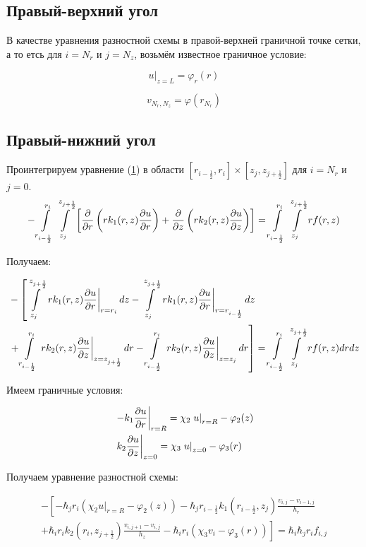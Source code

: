 \subsection{Правый-верхний угол}

В качестве уравнения разностной схемы в правой-верхней граничной точке сетки, а то етсь 
для $ i = N_r $ и $ j = N_z $, возьмём известное граничное условие:

\[
  \left . u \right \vert_{z=L} = \varphi_r(r) 
\]

\[
  v_{N_r,N_z} = \varphi(r_{N_r})
\]

\subsection{Правый-нижний угол}

Проинтегрируем уравнение (\hyperref[eq1]{1}) в области
$ [r_{i-\frac{1}{2}}, r_{i}] \times  [z_{j}, z_{j +\frac{1}{2}}] $
для $ i = N_r $ и $ j = 0 $.
\[
  - \int\limits^{r_{i }}_{r_{i -\frac{1}{2}}} \int\limits^{z_{j +\frac{1}{2}}}_{z_{j }} \left [ \pdv{}{r} \left ( r k_1(r, z) \pdv{u}{r} \right ) 
  + \pdv{}{z} \left ( rk_2(r, z)\pdv{u}{z} \right ) \right ] = \int\limits^{r_{i }}_{r_{i -\frac{1}{2}}} \int\limits^{z_{j +\frac{1}{2}}}_{z_{j }} rf(r, z)
\]

Получаем:

\begin{align*}
  &- \left [
   \int\limits^{z_{j +\frac{1}{2}}}_{z_{j }}  \left . r k_1(r, z) \pdv{u}{r} \right \vert_{r = r_i} dz
  - \int\limits^{z_{j +\frac{1}{2}}}_{z_{j }} \left . r k_1(r, z) \pdv{u}{r} \right \vert_{r = r_{i - \frac{1}{2}}} dz
  \right . \\
  &\left . + \int\limits^{r_{i}}_{r_{i-\frac{1}{2}}} \left . rk_2(r, z)\pdv{u}{z} \right \vert_{z = z_{j + \frac{1}{2}}} dr
  - \int\limits^{r_{i}}_{r_{i-\frac{1}{2}}} \left . rk_2(r, z)\pdv{u}{z} \right \vert_{z = z_{j}} dr
  \right ] = \int\limits^{r_{i }}_{r_{i -\frac{1}{2}}} \int\limits^{z_{j +\frac{1}{2}}}_{z_{j }} rf(r, z) dr dz
\end{align*}

Имеем граничные условия:

\begin{align*}
  &\left . -k_1 \pdv{u}{r} \right \vert_{r=R} = \chi_2 \left . u \right \vert_{r=R} - \varphi_2(z) \\
  &\left . k_2 \pdv{u}{z} \right \vert_{z=0} = \chi_3 \left . u \right \vert_{z=0} - \varphi_3(r) 
\end{align*}

Получаем уравнение разностной схемы:

\begin{align*}
  - \left [ 
  -\hbar_j r_i (\chi_2 \left . u \right \vert_{r=R} - \varphi_2(z) )
  - \hbar_j r_{i-\frac{1}{2}} k_1(r_{i-\frac{1}{2}}, z_j) \frac{v_{i, j} - v_{i - 1, j}}{h_{r}}
  \right . \\
  \left .
  + \hbar_i r_{i} k_2(r_i, z_{j+\frac{1}{2}}) \frac{v_{i, j + 1} - v_{i, j}}{h_{z}}
  - \hbar_i r_i (\chi_3 v_i - \varphi_3(r))
  \right ]  = \hbar_i \hbar_j r_i f_{i, j}
\end{align*}


